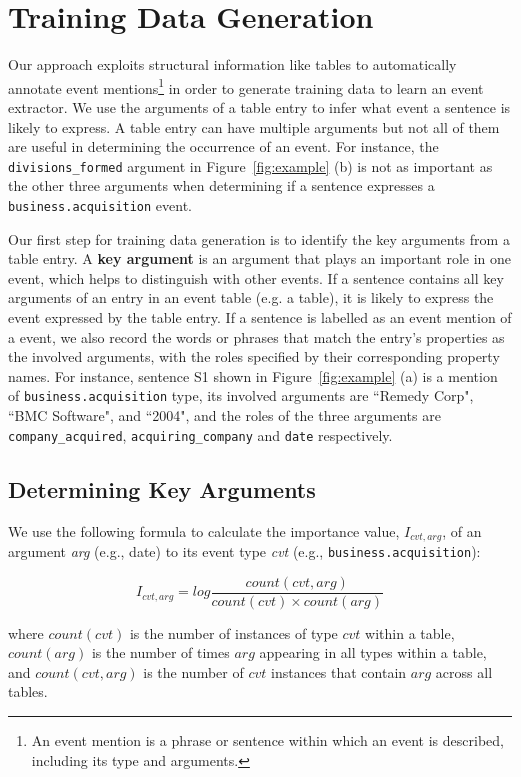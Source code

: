 \section{Training Data Generation}
Our approach exploits structural information like \FB \CVT tables to  automatically annotate event mentions\footnote{An event mention is a
phrase or sentence within which an event is described, including its type and arguments.} in order to generate training data to learn an
event extractor. We use the arguments of a \CVT table entry to infer what event a sentence is likely to express. A \CVT table entry can
have multiple arguments but not all of them are useful in determining the occurrence of an event. For instance, the
\texttt{divisions\_formed} argument in Figure~\ref{fig:example} (b) is not as important as the other three arguments when determining if a
sentence expresses a \texttt{business.acquisition} event.


Our first step for training data generation is to identify the key arguments from a \CVT table entry. A \textbf{key argument} is an
argument that plays an important role in one event, which helps to distinguish with other events. If a sentence contains all key arguments
of an entry in an event table (e.g. a \CVT table), it is likely to express the event expressed by the table entry. If a sentence is
labelled as an event mention of a \CVT event, we also record the words or phrases that match the entry's properties as the involved
arguments, with the roles specified by their corresponding property names. For instance, sentence S1 shown in Figure~\ref{fig:example} (a)
is a mention of \texttt{business.acquisition} type, its involved arguments are ``Remedy Corp", ``BMC Software", and ``2004", and the roles
of the three arguments are \texttt{company\_acquired}, \texttt{acquiring\_company} and \texttt{date} respectively.

\subsection{Determining Key Arguments}
We use the following formula to calculate the importance value, $I_{cvt, arg}$, of an argument \emph{arg} (e.g., date) to its event type
\emph{cvt} (e.g., \texttt{business.acquisition}):

\begin{equation}
	I_{cvt, arg} = log \frac{count(cvt, arg)}{count(cvt) \times count(arg)}
\end{equation}


where $count(cvt)$ is the number of instances of type $cvt$ within a \CVT table, $count(arg)$ is the number of times $arg$ appearing in all
\CVT types within a \CVT table, and $count(cvt, arg)$ is the number of $cvt$ instances that contain $arg$ across all \CVT tables.


